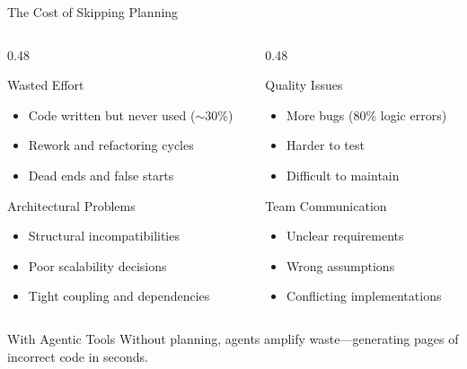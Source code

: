 \documentclass[aspectratio=169,10pt]{beamer}
\begin{document}
\begin{frame}{The Cost of Skipping Planning}
    \begin{columns}[T]
        \begin{column}{0.48\textwidth}
            \begin{block}{Wasted Effort}
                \begin{itemize}
                    \item Code written but never used ($\sim$30\%)
                    \item Rework and refactoring cycles
                    \item Dead ends and false starts
                \end{itemize}
            \end{block}
            \begin{block}{Architectural Problems}
                \begin{itemize}
                    \item Structural incompatibilities
                    \item Poor scalability decisions
                    \item Tight coupling and dependencies
                \end{itemize}
            \end{block}
        \end{column}
        \begin{column}{0.48\textwidth}
            \begin{block}{Quality Issues}
                \begin{itemize}
                    \item More bugs (80\% logic errors)
                    \item Harder to test
                    \item Difficult to maintain
                \end{itemize}
            \end{block}
            \begin{block}{Team Communication}
                \begin{itemize}
                    \item Unclear requirements
                    \item Wrong assumptions
                    \item Conflicting implementations
                \end{itemize}
            \end{block}
        \end{column}
    \end{columns}
    \vspace{0.3cm}
    \begin{alertblock}{With Agentic Tools}
        Without planning, agents amplify waste---generating pages of incorrect code in seconds.
    \end{alertblock}

\end{frame}
\end{document}
